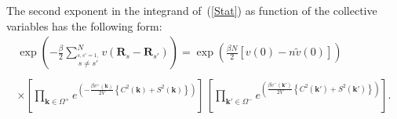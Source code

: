 \documentclass[aps,pre,preprint,floatfix,twoside,tightenlines,showpacs,
showkeys]{revtex4}
\begin{document}
The second exponent in the integrand of~(\ref{Stat}) as function of the collective variables has the following form:
\begin{equation}\label{Z-C-S}
\begin{array}{r}
    {\displaystyle \exp\left(-\frac{\beta}{2}\sum\limits_{\stackrel{\scriptstyle s,s'=1,}{s\neq s'}  }^{N} v\left(\textbf{R}_{s} - \textbf{R}_{s'}\right)\right) = \exp {\left( \frac{\beta N}{2} \left[v(0) - n\tilde{v}(0) \right] \right)}}\\ \\
\times {\displaystyle  \left[ \prod_{\mathbf{k}\in \Omega^+} e^{ \left( -\frac{\beta v^+(\mathbf{k})}{2V} \left\{ C^2(\mathbf{k}) + S^2(\mathbf{k}) \right\} \right)} \right]\, \left[ \prod_{\mathbf{k}'\in \Omega^-} e^{ \left( \frac{\beta v^-(\mathbf{k}')}{2V} \left\{ C^2(\mathbf{k}') + S^2(\mathbf{k}') \right\} \right)} \right] }.
\end{array}
\end{equation}
\end{document}
